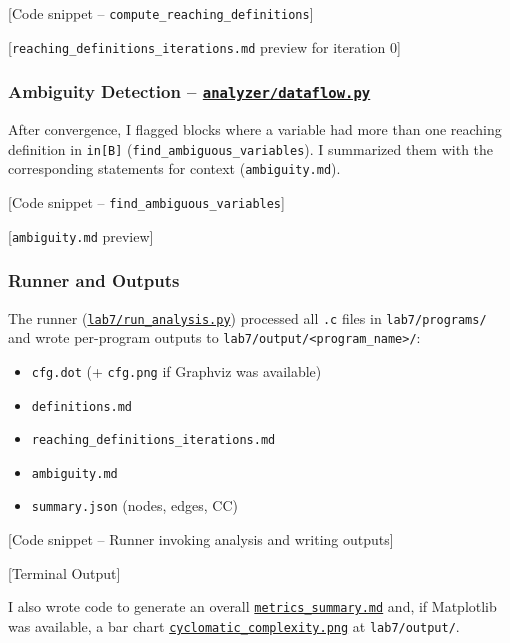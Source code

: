 [Code snippet -- \texttt{compute\_reaching\_definitions}]

[\texttt{reaching\_definitions\_iterations.md} preview for iteration 0]

\subsubsection{Ambiguity Detection -- \href{https://github.com/ShardulJunagade/cs202-stt/tree/main/lab7/analyzer/dataflow.py}{\texttt{analyzer/dataflow.py}}}
After convergence, I flagged blocks where a variable had more than one reaching definition in \texttt{in[B]} (\texttt{find\_ambiguous\_variables}). I summarized them with the corresponding statements for context (\texttt{ambiguity.md}).

[Code snippet -- \texttt{find\_ambiguous\_variables}]

[\texttt{ambiguity.md} preview]

\subsubsection{Runner and Outputs}
The runner (\href{https://github.com/ShardulJunagade/cs202-stt/tree/main/lab7/run_analysis.py}{\texttt{lab7/run\_analysis.py}}) processed all \texttt{.c} files in \texttt{lab7/programs/} and wrote per-program outputs to \texttt{lab7/output/\textless program\_name\textgreater{}/}:
\begin{itemize}[itemsep=0em, topsep=0pt]
    \item \texttt{cfg.dot} (+ \texttt{cfg.png} if Graphviz was available)
    \item \texttt{definitions.md}
    \item \texttt{reaching\_definitions\_iterations.md}
    \item \texttt{ambiguity.md}
    \item \texttt{summary.json} (nodes, edges, CC)
\end{itemize}

[Code snippet -- Runner invoking analysis and writing outputs]

[Terminal Output]

I also wrote code to generate an overall \href{https://github.com/ShardulJunagade/cs202-stt/tree/main/lab7/output/metrics_summary.md}{\texttt{metrics\_summary.md}} and, if Matplotlib was available, a bar chart \href{https://github.com/ShardulJunagade/cs202-stt/tree/main/lab7/output/cyclomatic_complexity.png}{\texttt{cyclomatic\_complexity.png}} at \texttt{lab7/output/}.

